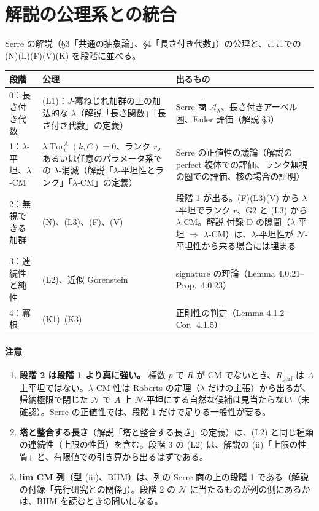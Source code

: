 \documentclass[11pt,a4paper]{ltjsarticle}
\theoremstyle{plain}
\theoremstyle{definition}
\theoremstyle{remark}
\theoremstyle{plain}
\newcommand{\Tor}{\operatorname{Tor}}
\begin{document}
\section{解説の公理系との統合}\label{sec:merge}

Serre の解説（\S 3「共通の抽象論」、\S 4「長さ付き代数」）の公理と、ここでの (N)(L)(F)(V)(K) を段階に並べる。
\begin{center}
\small
\begin{tabularx}{\textwidth}{>{\raggedright}p{2.6cm}>{\raggedright}X>{\raggedright\arraybackslash}p{4.2cm}}
\toprule
段階 & 公理 & 出るもの \\
\midrule
0：長さ付き代数 & (L1)：$J$-冪ねじれ加群の上の加法的な $\lambda$（解説「長さ関数」「長さ付き代数」の定義） & Serre 商 $\mathcal{A}_\lambda$、長さ付きアーベル圏、Euler 評価（解説 \S 3） \\
1：$\lambda$-平坦、$\lambda$-CM & $\lambda\Tor^A_i(k,C) = 0$、ランク $r$。あるいは任意のパラメータ系での $\lambda$-消滅（解説「$\lambda$-平坦性とランク」「$\lambda$-CM」の定義） & Serre の正値性の議論（解説の perfect 複体での評価、ランク無視の圏での評価、核の場合の証明） \\
2：無視できる加群 & (N)、(L3)、(F)、(V) & 段階 1 が出る。(F)(L3)(V) から $\lambda$-平坦でランク $r$、G2 と (L3) から $\lambda$-CM。解説 付録 D の隙間（$\lambda$-平坦 $\Rightarrow$ $\lambda$-CM）は、$\lambda$-平坦性が $\mathcal{N}$-平坦性から来る場合には埋まる \\
3：連続性と純性 & (L2)、近似 Gorenstein & signature の理論（Lemma 4.0.21--Prop.~4.0.23） \\
4：冪根 & (K1)--(K3) & 正則性の判定（Lemma 4.1.2--Cor.~4.1.5） \\
\bottomrule
\end{tabularx}
\end{center}

\paragraph{注意}
\begin{enumerate}
  \item \textbf{段階 2 は段階 1 より真に強い。} 標数 $p$ で $R$ が CM でないとき、$R_{\mathrm{perf}}$ は $A$ 上平坦ではない。$\lambda$-CM 性は Roberts の定理（$\lambda$ だけの主張）から出るが、帰納極限で閉じた $\mathcal{N}$ で $A$ 上 $\mathcal{N}$-平坦にする自然な候補は見当たらない（未確認）。Serre の正値性では、段階 1 だけで足りる一般性が要る。
  \item \textbf{塔と整合する長さ}（解説「塔と整合する長さ」の定義）は、(L2) と同じ種類の連続性（上限の性質）を含む。段階 3 の (L2) は、解説の (ii)「上限の性質」と、有限値での引き算から出るはずである。
  \item \textbf{lim CM 列}（型 (iii)、BHM）は、列の Serre 商の上の段階 1 である（解説の付録「先行研究との関係」）。段階 2 の $\mathcal{N}$ に当たるものが列の側にあるかは、BHM を読むときの問いになる。
\end{enumerate}
\end{document}
